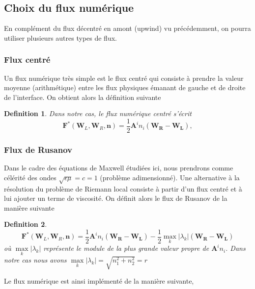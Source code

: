 \documentclass[a4paper,oneside,10pt]{report}
\newtheorem{mydef}{Definition}
\begin{document}
\subsection{Choix du flux numérique}

En complément du flux décentré en amont (upwind) vu précédemment, on pourra utiliser plusieurs autres types de flux. 

\subsubsection{Flux centré}
Un flux numérique très simple est le flux centré qui consiste à prendre la valeur moyenne (arithmétique) entre les flux physiques émanant de gauche et de droite de l'interface. On obtient alors la définition suivante 

\begin{mydef}
Dans notre cas, le flux numérique centré s'écrit 
\begin{equation}
 \mathbf{F}^*( \mathbf{W}_L,\mathbf{W}_R,\mathbf{n})  = \frac{1}{2}\mathbf{A}^i n_i(\mathbf{W_R} - \mathbf{W_L}),
 \end{equation}
\end{mydef}


\subsubsection{Flux de Rusanov}
Dans le cadre des équations de Maxwell étudiées ici, nous prendrons comme célérité des ondes $\sqrt{\epsilon\mu} = c =1$ (problème adimensionné).  Une alternative à la résolution du problème de Riemann local consiste à partir d'un flux centré et à lui ajouter un terme de viscosité. On définit alors le flux de Rusanov de la manière suivante

\begin{mydef}
\begin{equation}
 \mathbf{F}^*( \mathbf{W}_L,\mathbf{W}_R,\mathbf{n})  = \frac{1}{2}\mathbf{A}^i n_i(\mathbf{W_R} - \mathbf{W_L}) -\frac{1}{2}\max\limits_k |\lambda_k| (\mathbf{W_R} - \mathbf{W_L})
 \end{equation}
où $\max\limits_k |\lambda_k|$ représente le module de la plus grande valeur propre de $\mathbf{A}^i n_i$. Dans notre cas nous avons $\max\limits_k |\lambda_k|=\sqrt{n_1^2 + n_2^2} = r$
\end{mydef}

Le flux numérique est ainsi implémenté de la manière suivante,
\end{document}
